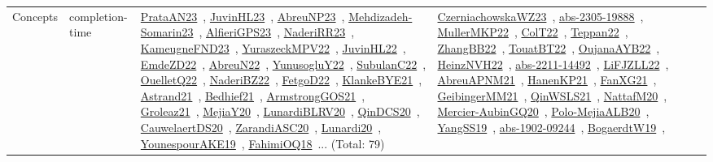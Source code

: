 {\begin{longtable}{lp{3cm}>{\raggedright\arraybackslash}p{6cm}>{\raggedright\arraybackslash}p{6cm}>{\raggedright\arraybackslash}p{8cm}}
Concepts & completion-time & \href{works/PrataAN23.pdf}{PrataAN23}~\cite{PrataAN23}, \href{works/JuvinHL23.pdf}{JuvinHL23}~\cite{JuvinHL23}, \href{works/AbreuNP23.pdf}{AbreuNP23}~\cite{AbreuNP23}, \href{works/Mehdizadeh-Somarin23.pdf}{Mehdizadeh-Somarin23}~\cite{Mehdizadeh-Somarin23}, \href{works/AlfieriGPS23.pdf}{AlfieriGPS23}~\cite{AlfieriGPS23}, \href{works/NaderiRR23.pdf}{NaderiRR23}~\cite{NaderiRR23}, \href{works/KameugneFND23.pdf}{KameugneFND23}~\cite{KameugneFND23}, \href{works/YuraszeckMPV22.pdf}{YuraszeckMPV22}~\cite{YuraszeckMPV22}, \href{works/JuvinHL22.pdf}{JuvinHL22}~\cite{JuvinHL22}, \href{works/EmdeZD22.pdf}{EmdeZD22}~\cite{EmdeZD22}, \href{works/AbreuN22.pdf}{AbreuN22}~\cite{AbreuN22}, \href{works/YunusogluY22.pdf}{YunusogluY22}~\cite{YunusogluY22}, \href{works/SubulanC22.pdf}{SubulanC22}~\cite{SubulanC22}, \href{works/OuelletQ22.pdf}{OuelletQ22}~\cite{OuelletQ22}, \href{works/NaderiBZ22.pdf}{NaderiBZ22}~\cite{NaderiBZ22}, \href{works/FetgoD22.pdf}{FetgoD22}~\cite{FetgoD22}, \href{works/KlankeBYE21.pdf}{KlankeBYE21}~\cite{KlankeBYE21}, \href{works/Astrand21.pdf}{Astrand21}~\cite{Astrand21}, \href{works/Bedhief21.pdf}{Bedhief21}~\cite{Bedhief21}, \href{works/ArmstrongGOS21.pdf}{ArmstrongGOS21}~\cite{ArmstrongGOS21}, \href{works/Groleaz21.pdf}{Groleaz21}~\cite{Groleaz21}, \href{works/MejiaY20.pdf}{MejiaY20}~\cite{MejiaY20}, \href{works/LunardiBLRV20.pdf}{LunardiBLRV20}~\cite{LunardiBLRV20}, \href{works/QinDCS20.pdf}{QinDCS20}~\cite{QinDCS20}, \href{works/CauwelaertDS20.pdf}{CauwelaertDS20}~\cite{CauwelaertDS20}, \href{works/ZarandiASC20.pdf}{ZarandiASC20}~\cite{ZarandiASC20}, \href{works/Lunardi20.pdf}{Lunardi20}~\cite{Lunardi20}, \href{works/YounespourAKE19.pdf}{YounespourAKE19}~\cite{YounespourAKE19}, \href{works/FahimiOQ18.pdf}{FahimiOQ18}~\cite{FahimiOQ18}... (Total: 79) & \href{works/CzerniachowskaWZ23.pdf}{CzerniachowskaWZ23}~\cite{CzerniachowskaWZ23}, \href{works/abs-2305-19888.pdf}{abs-2305-19888}~\cite{abs-2305-19888}, \href{works/MullerMKP22.pdf}{MullerMKP22}~\cite{MullerMKP22}, \href{works/ColT22.pdf}{ColT22}~\cite{ColT22}, \href{works/Teppan22.pdf}{Teppan22}~\cite{Teppan22}, \href{works/ZhangBB22.pdf}{ZhangBB22}~\cite{ZhangBB22}, \href{works/TouatBT22.pdf}{TouatBT22}~\cite{TouatBT22}, \href{works/OujanaAYB22.pdf}{OujanaAYB22}~\cite{OujanaAYB22}, \href{works/HeinzNVH22.pdf}{HeinzNVH22}~\cite{HeinzNVH22}, \href{works/abs-2211-14492.pdf}{abs-2211-14492}~\cite{abs-2211-14492}, \href{works/LiFJZLL22.pdf}{LiFJZLL22}~\cite{LiFJZLL22}, \href{works/AbreuAPNM21.pdf}{AbreuAPNM21}~\cite{AbreuAPNM21}, \href{works/HanenKP21.pdf}{HanenKP21}~\cite{HanenKP21}, \href{works/FanXG21.pdf}{FanXG21}~\cite{FanXG21}, \href{works/GeibingerMM21.pdf}{GeibingerMM21}~\cite{GeibingerMM21}, \href{works/QinWSLS21.pdf}{QinWSLS21}~\cite{QinWSLS21}, \href{works/NattafM20.pdf}{NattafM20}~\cite{NattafM20}, \href{works/Mercier-AubinGQ20.pdf}{Mercier-AubinGQ20}~\cite{Mercier-AubinGQ20}, \href{works/Polo-MejiaALB20.pdf}{Polo-MejiaALB20}~\cite{Polo-MejiaALB20}, \href{works/YangSS19.pdf}{YangSS19}~\cite{YangSS19}, \href{works/abs-1902-09244.pdf}{abs-1902-09244}~\cite{abs-1902-09244}, \href{works/BogaerdtW19.pdf}{BogaerdtW19}~\cite{BogaerdtW19}, 
\end{longtable}}
